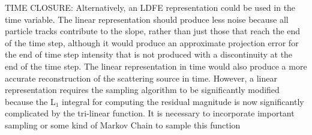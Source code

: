 TIME CLOSURE:
Alternatively, an LDFE representation could be used in the time
variable. The linear representation should produce less noise because all particle tracks
contribute to the slope, rather than just those that reach the end of the time step,
although it would produce an approximate projection error for the end of time step
intensity that is not produced with a discontinuity at the end of the time step.  The
linear representation in time would also produce a more accurate reconstruction of the
scattering source in time.  However, a linear representation requires the sampling
algorithm to be significantly modified because the L$_1$ integral for computing the
residual magnitude is now significantly complicated by the tri-linear function.  It is
necessary to incorporate important sampling or some kind of Markov Chain to sample this
function~\cite{shultis_mc}



